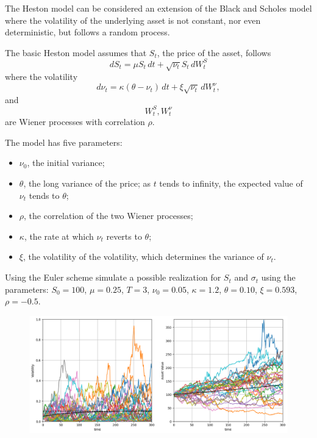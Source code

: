 \documentclass[12pt,a4paper]{article}
\begin{document}
\begin{question}
The Heston model can be considered an extension of the Black and Scholes model where the volatility of the underlying asset is not constant, nor even deterministic, but follows a random process.

The basic Heston model assumes that $S_t$, the price of the asset, follows
\begin{equation}
dS_{t}=\mu S_{t}\,dt+{\sqrt {\nu _{t}}}S_{t}\,dW_{t}^{S}
\end{equation}
where the volatility 
\begin{equation}
{\displaystyle d\nu _{t}=\kappa (\theta -\nu _{t})\,dt+\xi {\sqrt {\nu _{t}}}\,dW_{t}^{\nu },}
\end{equation}
and 
\begin{equation}
W_{t}^{S},W_{t}^{\nu }
\end{equation} 
are Wiener processes with correlation $\rho$.

The model has five parameters:
\begin{itemize}
\item $\nu _0$, the initial variance;
\item $\theta$, the long variance of the price; as $t$ tends to infinity, the expected value of $\nu_t$ tends to $\theta$;
\item $\rho$, the correlation of the two Wiener processes;
\item $\kappa$, the rate at which $\nu_t$ reverts to $\theta$;
\item $\xi$, the volatility of the volatility, which determines the variance of $\nu_t$.
\end{itemize}

Using the Euler scheme simulate a possible realization for $S_t$ and $\sigma_t$ using the parameters: $S_0=100$, $\mu=0.25$, $T=3$, $\nu_0=0.05$, $\kappa=1.2$, $\theta=0.10$, $\xi=0.593$, $\rho=-0.5$.

\begin{figure}[htbp]
\begin{center}
\includegraphics[width=0.8\linewidth]{addons/heston}
\end{center}
\label{fig:heston}
\end{figure}
\end{question}
\end{document}
